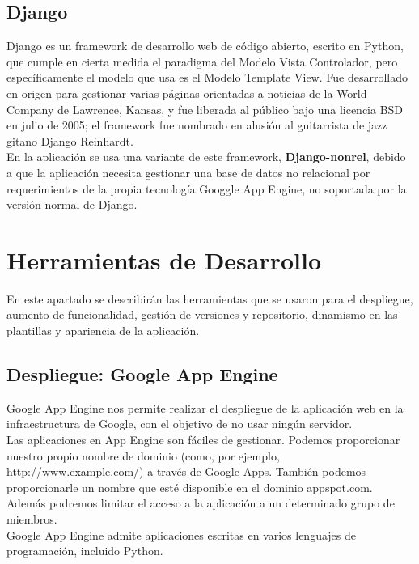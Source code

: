 \subsection{Django}
Django es un framework de desarrollo web de código abierto, escrito en Python, que cumple en cierta medida el paradigma del Modelo Vista Controlador, 
pero específicamente el modelo que usa es el Modelo Template View. Fue desarrollado en origen para gestionar varias páginas orientadas a noticias de la World Company de Lawrence, Kansas, 
y fue liberada al público bajo una licencia BSD en julio de 2005; el framework fue nombrado en alusión al guitarrista de jazz gitano Django Reinhardt.\\

En la aplicación se usa una variante de este framework, \textbf{Django-nonrel}, debido a que la aplicación necesita gestionar una base de datos no relacional por requerimientos
de la propia tecnología Googgle App Engine, no soportada por la versión normal de Django.




\section{Herramientas de Desarrollo}
\label{2:sec3}

En este apartado se describirán las herramientas que se usaron para el despliegue, aumento de funcionalidad, 
gestión de versiones y repositorio, dinamismo en las plantillas y apariencia de la aplicación.\\

\subsection{Despliegue: Google App Engine}
Google App Engine nos permite realizar el despliegue de la aplicación web en la infraestructura de Google, con el objetivo de no usar ningún servidor.\\


Las aplicaciones en App Engine son fáciles de gestionar. Podemos proporcionar nuestro propio nombre de dominio (como, por ejemplo, http://www.example.com/) 
a través de Google Apps. También podemos proporcionarle un nombre que esté disponible en el dominio appspot.com. 
Además podremos limitar el acceso a la aplicación a un determinado grupo de miembros.\\

Google App Engine admite aplicaciones escritas en varios lenguajes de programación, incluido Python.\\

